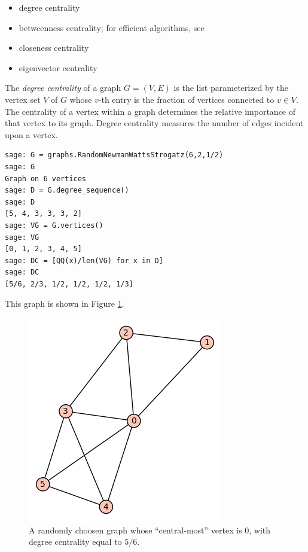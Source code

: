 \begin{itemize}
\item degree centrality

\item betweenness centrality; for efficient algorithms,
  see~\cite{Brandes2001, YangChen2011}

\item closeness centrality

\item eigenvector centrality
\end{itemize}


The {\it degree centrality} of a graph $G = (V,E)$ is the list parameterized by the
vertex set $V$ of $G$ whose $v$-th entry is the fraction of
vertices connected to $v\in V$.
The centrality of a vertex within a graph determines the
relative importance of that vertex to its graph. Degree centrality
measures the number of edges incident upon a vertex.

\begin{lstlisting}
sage: G = graphs.RandomNewmanWattsStrogatz(6,2,1/2)
sage: G
Graph on 6 vertices
sage: D = G.degree_sequence()
sage: D
[5, 4, 3, 3, 3, 2]
sage: VG = G.vertices()
sage: VG
[0, 1, 2, 3, 4, 5]
sage: DC = [QQ(x)/len(VG) for x in D]
sage: DC
[5/6, 2/3, 1/2, 1/2, 1/2, 1/3]
\end{lstlisting}

This graph is shown in Figure \ref{fig:distance_connectivity:random-NWS-graph}.

\begin{figure}[!htbp]
\centering
{}
\includegraphics{image/distance-connectivity/random-NWS-graph}
\caption{A randomly choosen graph whose ``central-most'' vertex is $0$, with
degree centrality equal to $5/6$.}
\label{fig:distance_connectivity:random-NWS-graph}
\end{figure}

